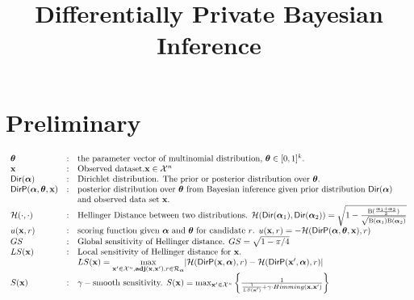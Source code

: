 \documentclass{article}
\begin{document}
\title{ Differentially Private Bayesian Inference}

\author{} %

\maketitle

\section{Preliminary}
\[
\begin{array}{lcl}
	\boldsymbol{\theta} 
	& : &
	\mbox{the parameter vector of multinomial distribution, $\boldsymbol{\theta}\in [0,1]^{k}$}.\\
	\textbf{x} 
	& : &
	\mbox{Observed dataset.} \textbf{x} \in \mathcal{X}^n\\
	\mathsf{Dir}(\boldsymbol{\alpha}) 
	& : &
	\mbox{Dirichlet distribution. The prior or posterior distribution over $\boldsymbol{\theta}$.}\\
	\mathsf{DirP}(\boldsymbol{\alpha}, \boldsymbol{\theta}, \textbf{x})
	& : & 
	\mbox{posterior distribution over $\boldsymbol{\theta}$ from Bayesian inference given prior distribution $\mathsf{Dir}(\boldsymbol{\alpha})$}\\
	& &
	\mbox{and observed data set $\textbf{x}$.}\\
	\mathcal{H}(\cdot, \cdot)
	& : &
   \mbox{Hellinger Distance between two distributions. }
   \mathcal{H}(\mathsf{Dir}(\boldsymbol{\alpha}_1), \mathsf{Dir}(\boldsymbol{\alpha}_2)) = \sqrt{1 - \frac{\textup{B}(\frac{\boldsymbol{\alpha}_1 + \boldsymbol{\alpha}_2}{2})}{\sqrt{\textup{B}(\boldsymbol{\alpha}_1) \textup{B}(\boldsymbol{\alpha}_2)}}} \\
   u(\textbf{x}, r)
   & : &
   \mbox{scoring function given $\boldsymbol{\alpha}$ and $\boldsymbol{\theta}$ for candidate $r$. }
   u(\textbf{x}, r) =
   -\mathcal{H}(\mathsf{DirP}(\boldsymbol{\alpha}, \boldsymbol{\theta}, \textbf{x}), r)\\
   GS
   & : & 
   \mbox{Global sensitivity of Hellinger distance. }
   GS = \sqrt{1 - \pi/4}\\
   LS(\textbf{x})
   & : & 
   \mbox{Local sensitivity of Hellinger distance for $\textbf{x}$. }\\
   & &
   LS(\textbf{x}) = \max\limits_{\textbf{x}'\in\mathcal{X}^n,\textbf{adj}(\textbf{x},\textbf{x}'), r\in \mathcal{R}_{\boldsymbol{\alpha}}}
   \lvert \mathcal{H}(\mathsf{DirP}(\textbf{x},\boldsymbol{\alpha}), r) - \mathcal{H}(\mathsf{DirP}(\textbf{x}',\boldsymbol{\alpha}), r)\rvert \\
   S(\textbf{x})
   & : & 
   \gamma-\mbox{smooth sensitivity. }
   S(\textbf{x})=\max_{\textbf{x}' \in \mathcal{X}^{n}}\bigg \{ \frac{1}{\frac{1}{LS(\textbf{x}')} +\gamma \cdot Himming(\textbf{x},\textbf{x}')} \bigg \}
\end{array}
\]
\end{document}
